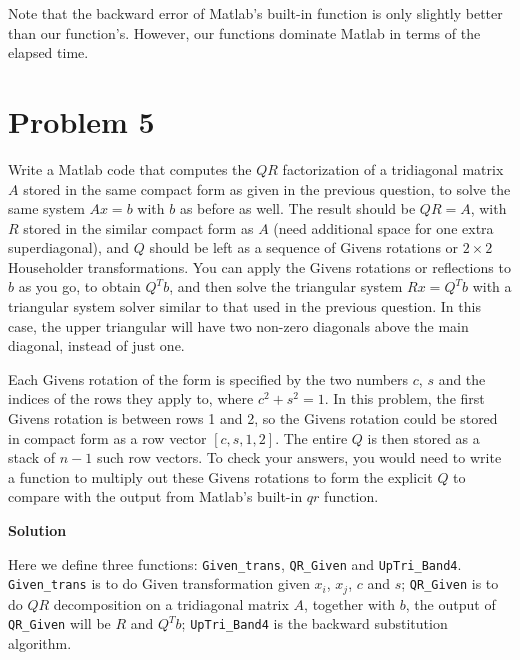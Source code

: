 \documentclass[12pt,oneside,a4paper]{article}
\newcommand{\problem}[1]
{
    \clearpage
    \section*{Problem {#1}}
}
\newcommand{\solution}
{
    \vspace{15pt}
    \noindent\ignorespaces\textbf{\large Solution}\par
}
\newcommand{\m}[1]{\texttt{{#1}}}
\begin{document}
Note that the backward error of Matlab's built-in function is only slightly better than our function's. However, our functions dominate Matlab in terms of the elapsed time. 

\problem{5}
Write a Matlab code that computes the $QR$ factorization of a tridiagonal matrix $A$ stored in the same compact form as given in the previous question, to solve the same system $Ax = b$ with $b$ as before as well. The result should be $QR = A$, with $R$ stored in the similar compact form as $A$ (need additional space for one extra superdiagonal), and $Q$ should be left as a sequence of Givens rotations or $2 \times 2$ Householder transformations. You can apply the Givens rotations or reflections to $b$ as you go, to obtain $Q^{T}b$, and then solve the triangular system $Rx = Q^{T}b$ with a triangular system solver similar to that used in the previous question. In this case, the upper triangular will have two non-zero diagonals above the main diagonal, instead of just one.

Each Givens rotation of the form is specified by the two numbers $c$, $s$ and the indices of the rows they apply to, where $c^2 + s^2 = 1$. In this problem, the first Givens rotation is between rows 1 and 2, so the Givens rotation could be stored in compact form as a row vector $[c, s, 1, 2]$. The entire $Q$ is then stored as a stack of $n − 1$ such row vectors. To check your answers, you would need to write a function to multiply out these Givens rotations to form the explicit $Q$ to compare with the output from Matlab’s built-in $qr$ function.

\solution
Here we define three functions: \m{Given\_trans}, \m{QR\_Given} and \m{UpTri\_Band4}. \m{Given\_trans} is to do Given transformation given $x_{i}$, $x_{j}$, $c$ and $s$; \m{QR\_Given} is to do $QR$ decomposition on a tridiagonal matrix $A$, together with $b$, the output of \m{QR\_Given} will be $R$ and $Q^{T}b$; \m{UpTri\_Band4} is the backward substitution algorithm.
\end{document}
